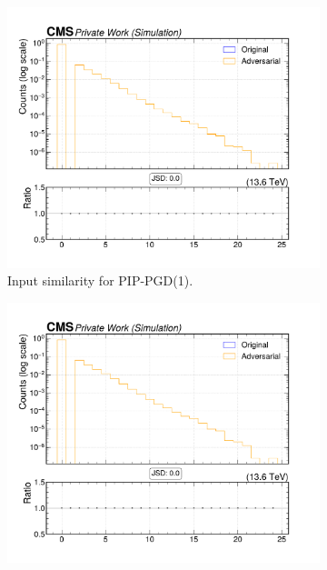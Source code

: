 \begin{figure}[htbp]
  \centering
  \begin{subfigure}[t]{0.32\textwidth}
    \includegraphics[width=\linewidth]{media/output/features/compare/combined_it_1/cmp_vtx_arr_sv_ntracks.pdf}
    \caption*{Input similarity for PIP-PGD(1).}
  \end{subfigure}\hfill
  \begin{subfigure}[t]{0.32\textwidth}
    \includegraphics[width=\linewidth]{media/output/features/compare/combined_it_2/cmp_vtx_arr_sv_ntracks.pdf}

\end{subfigure}
\end{figure}
